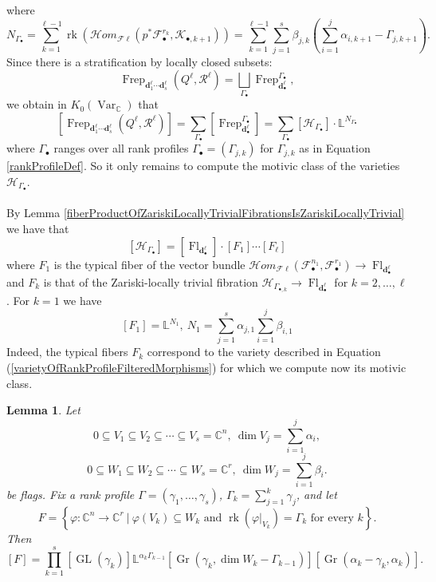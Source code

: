 \documentclass{amsart}
\theoremstyle{plain}
\newtheorem{lemma}[theorem]{Lemma}
\numberwithin{equation}{section}
\theoremstyle{definition}
\theoremstyle{remark}
\begin{document}
	where
	$$
	N_{\Gamma_\bullet}=\sum_{k=1}^{\ell-1}
	\operatorname{rk}
	(\mathcal H om_{\mathcal F\ell}
	\left(
	p^*\mathcal F^{r_k}_\bullet,
	\mathcal K_{\bullet,k+1}
	\right))=\sum_{k=1}^{\ell-1}\sum_{j=1}^{s}\beta_{j,k}\left(\sum_{i=1}^{j}\alpha_{i,k+1}-\Gamma_{j,k+1}\right).
	$$
	Since there is a stratification by locally closed subsets:
	$$
	\operatorname{Frep}_{\mathbf d^\ell_1\cdots\mathbf d^\ell_s}
	(Q^\ell,\mathcal R^\ell)
	=
	\bigsqcup_{\Gamma_\bullet}
	\operatorname{Frep}^{\Gamma_\bullet}_{\mathbf{d}_\bullet^\ell},
	$$
	we obtain in $K_0(\operatorname{Var}_\mathbb{C})$ that
	$$
	[
	\operatorname{Frep}_{\mathbf d^\ell_1\cdots\mathbf d^\ell_s}
	(Q^\ell,\mathcal R^\ell)
	]
	=
	\sum_{\Gamma_\bullet}
	[\operatorname{Frep}^{\Gamma_\bullet}_{\mathbf{d}^\ell_\bullet}]=\sum_{\Gamma_\bullet}[\mathcal{H}_{\Gamma_\bullet}]\cdot
	\mathbb L^{N_{\Gamma_\bullet}}
	$$
	where $\Gamma_\bullet$ ranges over all rank profiles
	$\Gamma_\bullet=(\Gamma_{j,k})$ for $\Gamma_{j,k}$ as in Equation \ref{rankProfileDef}. So it only remains to compute the motivic class of the varieties $\mathcal{H}_{\Gamma_\bullet}$. 
	\\
	\\
	By Lemma \ref{fiberProductOfZariskiLocallyTrivialFibrationsIsZariskiLocallyTrivial} we have that 
	$$
	[\mathcal{H}_{\Gamma_\bullet}]=[\operatorname{Fl}_{\mathbf{d}^\ell_\bullet }]\cdot [F_1]\cdots[F_\ell]
	$$
	where $F_1$ is the typical fiber of the vector bundle $\mathcal{H}om_{\mathcal{F}\ell}(\mathcal{F}^{n_1}_{\bullet},\mathcal{F}^{r_1}_\bullet)\to \operatorname{Fl}_{\mathbf{d}^\ell_\bullet }$ and $F_k$ is that of the Zariski-locally trivial fibration $\mathcal{H}_{\Gamma_{\bullet,k}} \to \operatorname{Fl}_{\mathbf{d}^\ell_\bullet }$ for $k=2,\ldots,\ell$. For $k=1$ we have
	$$
	[F_1]=\mathbb{L}^{N_1}, \ N_1=\sum_{j=1}^{s}\alpha_{j,1}\sum_{i=1}^j\beta_{i,1}
	$$ Indeed, the typical fibers $F_k$ correspond to the variety described in Equation (\ref{varietyOfRankProfileFilteredMorphisms}) for which we compute now its motivic class. 
	\begin{lemma}
		Let
		$$
		0\subseteq V_{1}\subseteq V_{2}\subseteq\cdots\subseteq  V_{s}=\mathbb{C}^{n}, \ \dim V_{j}=\sum_{i=1}^{j}\alpha_{i},
		$$
		$$
		0\subseteq W_{1}\subseteq W_{2}\subseteq\cdots\subseteq  W_{s}=\mathbb{C}^{r}, \ \dim W_{j}=\sum_{i=1}^{j}\beta_{i}.
		$$ 
		be flags.
		Fix a rank profile $\Gamma=(\gamma_1,\ldots,\gamma_s)$, $\Gamma_k=\sum_{j=1}^k\gamma_j$, and let 
		$$
		F=\left\{
		\varphi:\mathbb{C}^n\to \mathbb{C}^r
		\ | \
		\varphi(V_k)\subseteq W_k
		\text{ and }
		\operatorname{rk}(\varphi|_{V_k})=\Gamma_k
		\text{ for every }k
		\right\}.
		$$
		Then 
		$$
		[F]=\prod_{k=1}^s[\operatorname{GL}(\gamma_k)]\mathbb{L}^{\alpha_{k}\Gamma_{k-1}}[\operatorname{Gr}(\gamma_k,\dim W_k-\Gamma_{k-1})][\operatorname{Gr}(\alpha_k-\gamma_k,\alpha_k)].
		$$
	\end{lemma}
\end{document}
